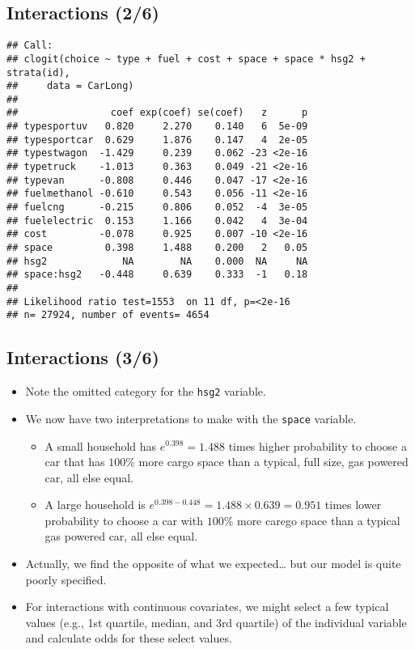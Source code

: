 \documentclass[
  11pt,
]{article}
\providecommand{\tightlist}{%
  \setlength{\itemsep}{0pt}\setlength{\parskip}{0pt}}
\begin{document}
\normalsize

\hypertarget{interactions-26}{%
\subsection{Interactions (2/6)}\label{interactions-26}}

\footnotesize

\begin{verbatim}
## Call:
## clogit(choice ~ type + fuel + cost + space + space * hsg2 + strata(id), 
##     data = CarLong)
## 
##                coef exp(coef) se(coef)   z      p
## typesportuv   0.820     2.270    0.140   6  5e-09
## typesportcar  0.629     1.876    0.147   4  2e-05
## typestwagon  -1.429     0.239    0.062 -23 <2e-16
## typetruck    -1.013     0.363    0.049 -21 <2e-16
## typevan      -0.808     0.446    0.047 -17 <2e-16
## fuelmethanol -0.610     0.543    0.056 -11 <2e-16
## fuelcng      -0.215     0.806    0.052  -4  3e-05
## fuelelectric  0.153     1.166    0.042   4  3e-04
## cost         -0.078     0.925    0.007 -10 <2e-16
## space         0.398     1.488    0.200   2   0.05
## hsg2             NA        NA    0.000  NA     NA
## space:hsg2   -0.448     0.639    0.333  -1   0.18
## 
## Likelihood ratio test=1553  on 11 df, p=<2e-16
## n= 27924, number of events= 4654
\end{verbatim}

\normalsize

\hypertarget{interactions-36}{%
\subsection{Interactions (3/6)}\label{interactions-36}}

\begin{itemize}
\item
  Note the omitted category for the \texttt{hsg2} variable.
\item
  We now have two interpretations to make with the \texttt{space}
  variable.

  \begin{itemize}
  \tightlist
  \item
    A small household has \(e^{0.398}=1.488\) times higher probability
    to choose a car that has \(100\%\) more cargo space than a typical,
    full size, gas powered car, all else equal.
  \item
    A large household is
    \(e^{0.398-0.448} = 1.488 \times 0.639 = 0.951\) times lower
    probability to choose a car with \(100\%\) more carego space than a
    typical gas powered car, all else equal.
  \end{itemize}
\item
  Actually, we find the opposite of what we expected\ldots{} but our
  model is quite poorly specified.
\item
  For interactions with continuous covariates, we might select a few
  typical values (e.g., 1st quartile, median, and 3rd quartile) of the
  individual variable and calculate odds for these select values.
\end{itemize}
\end{document}
